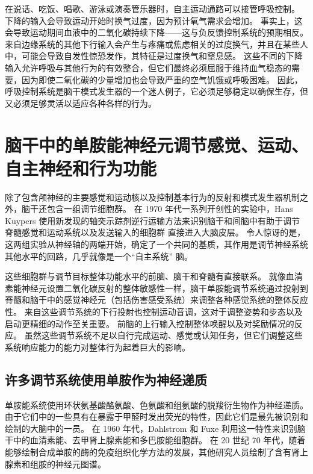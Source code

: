 在说话、吃饭、唱歌、游泳或演奏管乐器时，自主运动通路可以接管呼吸控制。
下降的输入会导致运动开始时换气过度，因为预计氧气需求会增加。
事实上，这会导致运动期间血液中的二氧化碳持续下降——这与负反馈控制系统的预期相反。
来自边缘系统的其他下行输入会产生与疼痛或焦虑相关的过度换气，并且在某些人中，可能会导致自发性惊恐发作，其特征是过度换气和窒息感。
这些不同的下降输入允许呼吸与其他行为的有效整合，但它们最终必须屈服于维持血气稳态的需要，因为即使二氧化碳的少量增加也会导致严重的空气饥饿或呼吸困难。
因此，呼吸控制系统是脑干模式发生器的一个迷人例子，它必须足够稳定以确保生存，但又必须足够灵活以适应各种各样的行为。



\section{脑干中的单胺能神经元调节感觉、运动、自主神经和行为功能}

除了包含颅神经的主要感觉和运动核以及控制基本行为的反射和模式发生器机制之外，脑干还包含一组调节细胞群。
在 1970 年代一系列开创性的实验中，Hans Kuypers 使用新发现的轴突示踪剂逆行运输方法来识别脑干和间脑中有助于调节脊髓感觉和运动系统以及发送输入的细胞群 直接进入大脑皮层。
令人惊讶的是，这两组实验从神经轴的两端开始，确定了一个共同的基质，其作用是调节神经系统其他水平的回路，几乎就像是一个“自主系统” 脑。


这些细胞群与调节目标整体功能水平的前脑、脑干和脊髓有直接联系。
就像血清素能神经元设置二氧化碳反射的整体敏感性一样，脑干单胺能调节系统通过投射到脊髓和脑干中的感觉神经元（包括伤害感受系统）来调整各种感觉系统的整体反应性。
来自这些调节系统的下行投射也控制运动音调，这对于调整姿势和步态以及启动更精细的动作至关重要。
前脑的上行输入控制整体唤醒以及对奖励情况的反应。
虽然这些调节系统不足以自行完成运动、感觉或认知任务，但它们调整这些系统响应能力的能力对整体行为起着巨大的影响。



\subsection{许多调节系统使用单胺作为神经递质}

单胺能系统使用环状氨基酸酪氨酸、色氨酸和组氨酸的脱羧衍生物作为神经递质。
由于它们中的一些具有在暴露于甲醛时发出荧光的特性，因此它们是最先被识别和绘制的大脑中的一员。
在 1960 年代，Dahlstrom 和 Fuxe 利用这一特性来识别脑干中的血清素能、去甲肾上腺素能和多巴胺能细胞群。
在 20 世纪 70 年代，随着能够绘制合成单胺的酶的免疫组织化学方法的发展，其他研究人员绘制了含有肾上腺素和组胺的神经元图谱。


